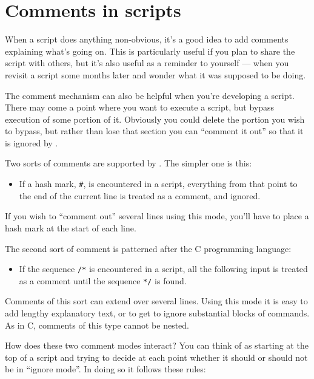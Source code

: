 \chapter{Comments in scripts}
\label{chap:comments}

When a script does anything non-obvious, it's a good idea to add
comments explaining what's going on.  This is particularly useful if
you plan to share the script with others, but it's also useful as a
reminder to yourself --- when you revisit a script some months later
and wonder what it was supposed to be doing.

The comment mechanism can also be helpful when you're developing a
script.  There may come a point where you want to execute a script,
but bypass execution of some portion of it.  Obviously you could
delete the portion you wish to bypass, but rather than lose that
section you can ``comment it out'' so that it is ignored by
.

Two sorts of comments are supported by .  The simpler one
is this:

\begin{itemize}
\item If a hash mark, \texttt{\#}, is encountered in a  script, 
  everything from that point to the end of the current line is treated as a 
  comment, and ignored.
\end{itemize}

If you wish to ``comment out'' several lines using this mode, you'll
have to place a hash mark at the start of each line.

The second sort of comment is patterned after the C programming language:

\begin{itemize}
\item If the sequence \texttt{/*} is encountered in a script, all the
  following input is treated as a comment until the sequence \texttt{*/}
  is found.
\end{itemize}

Comments of this sort can extend over several lines.  Using this mode
it is easy to add lengthy explanatory text, or to get  to
ignore substantial blocks of commands.  As in C, comments of this
type cannot be nested.

How does these two comment modes interact?  You can think of
 as starting at the top of a script and trying to decide at
each point whether it should or should not be in ``ignore mode''.  In
doing so it follows these rules:

